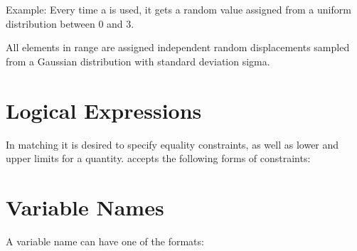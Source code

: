 Example: 
Every time a is used, it gets a random value assigned from a uniform
distribution between 0 and 3.  

All elements in range are assigned independent random displacements
sampled from a Gaussian distribution with standard deviation sigma.  



%
\section{Logical Expressions}
\label{sec:logicalexpr}

In matching it is desired to specify equality constraints, as well as
lower and upper limits for a quantity. \madx accepts the following forms
of constraints:  






%
\section{Variable Names}
\label{sec:variable}
A variable name can have one of the formats: 

